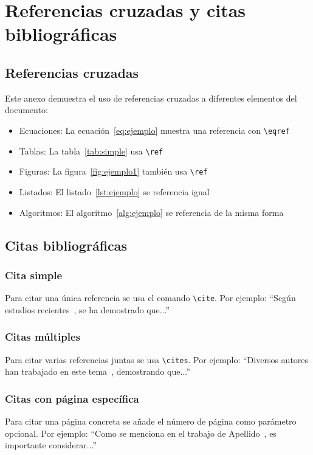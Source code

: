 \section{Referencias cruzadas y citas bibliográficas}

\subsection{Referencias cruzadas}
Este anexo demuestra el uso de referencias cruzadas a diferentes elementos del documento:
\begin{itemize}
  \item Ecuaciones: La ecuación~\eqref{eq:ejemplo} muestra una referencia con \texttt{\textbackslash eqref}
  \item Tablas: La tabla~\ref{tab:simple} usa \texttt{\textbackslash ref}
  \item Figuras: La figura~\ref{fig:ejemplo1} también usa \texttt{\textbackslash ref}
  \item Listados: El listado~\ref{lst:ejemplo} se referencia igual
  \item Algoritmos: El algoritmo~\ref{alg:ejemplo} se referencia de la misma forma
\end{itemize}

\subsection{Citas bibliográficas}
\subsubsection{Cita simple}
Para citar una única referencia se usa el comando \texttt{\textbackslash cite}. Por ejemplo: ``Según estudios recientes~\cite{Apellido2020}, se ha demostrado que...''

\subsubsection{Citas múltiples}
Para citar varias referencias juntas se usa \texttt{\textbackslash cites}. Por ejemplo: ``Diversos autores han trabajado en este tema~\cites{Apellido2020,Apellido2021}, demostrando que...''

\subsubsection{Citas con página específica}
Para citar una página concreta se añade el número de página como parámetro opcional. Por ejemplo: ``Como se menciona en el trabajo de Apellido~\cite[][p.~105]{Apellido2021}, es importante considerar...''

